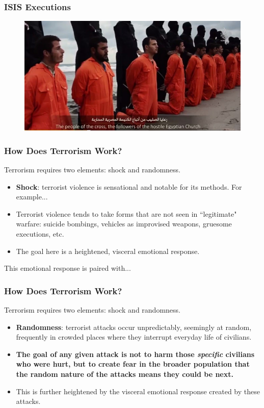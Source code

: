\documentclass[handout]{beamer}
\begin{document}
\begin{frame} 
	\frametitle{\LARGE{ISIS Executions}}
	\begin{figure}[ht!]
		\centering
		\includegraphics[width=\textwidth,height=0.9\textheight,keepaspectratio]{ISISexec.jpg}
	\end{figure}
\end{frame}

\begin{frame} 
	\frametitle{\LARGE{How Does Terrorism Work?}}
	Terrorism requires two elements: shock and randomness.
	\begin{itemize}
		\item \textbf{Shock}: terrorist violence is sensational and notable for its methods. For example...	
		\item Terrorist violence tends to take forms that are not seen in ``legitimate" warfare: suicide bombings, vehicles as improvised weapons, gruesome executions, etc. \pause
		\item The goal here is a heightened, visceral emotional response.	
	\end{itemize}
This emotional response is paired with...
\end{frame}

\begin{frame} 
	\frametitle{\LARGE{How Does Terrorism Work?}}
Terrorism requires two elements: shock and randomness.
	\begin{itemize}
		\item \textbf{Randomness}: terrorist attacks occur unpredictably, seemingly at random, frequently in crowded places where they interrupt everyday life of civilians. \pause
		\item \textbf{The goal of any given attack is not to harm those \textit{specific} civilians who were hurt, but to create fear in the broader population that the random nature of the attacks means they could be next.} \pause
		\item This is further heightened by the visceral emotional response created by these attacks.
	\end{itemize}
\end{frame}
\end{document}
